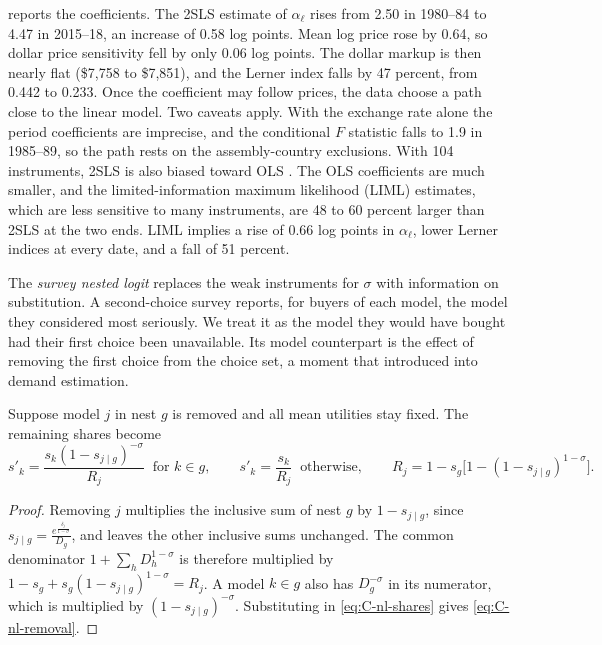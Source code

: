  reports the coefficients. The 2SLS estimate of $\alpha_\ell$ rises from 2.50 in 1980--84 to
4.47 in 2015--18, an increase of 0.58 log points. Mean log price rose by 0.64, so dollar price sensitivity fell by only
0.06 log points. The dollar markup is then nearly flat (\$7,758 to \$7,851), and the Lerner index falls by 47 percent,
from 0.442 to 0.233. Once the coefficient may follow prices, the data choose a path close to the linear model. Two
caveats apply. With the exchange rate alone the period coefficients are imprecise, and the conditional $F$ statistic
falls to 1.9 in 1985--89, so the path rests on the assembly-country exclusions. With 104 instruments, 2SLS is also
biased toward OLS \citep{Bekker1994}. The OLS coefficients are much smaller, and the limited-information maximum
likelihood (LIML) estimates, which are less sensitive to many instruments, are 48 to 60 percent larger than 2SLS at the
two ends. LIML implies a rise of 0.66 log points in $\alpha_\ell$, lower Lerner indices at every date, and a fall of 51
percent.

The \emph{survey nested logit} replaces the weak instruments for $\sigma$ with information on substitution. A
second-choice survey reports, for buyers of each model, the model they considered most seriously. We treat it as the
model they would have bought had their first choice been unavailable. Its model
counterpart is the effect of removing the first choice from the choice set, a moment that \citet{BerryLevinsohnPakes2004}
introduced into demand estimation.

\begin{lemma}\label{lem:C-nl-removal}
Suppose model $j$ in nest $g$ is removed and all mean utilities stay fixed. The remaining shares become
\begin{equation}\label{eq:C-nl-removal}
  s'_k = \frac{s_k(1 - s_{j\mid g})^{-\sigma}}{R_j} \ \text{ for } k \in g , \qquad
  s'_k = \frac{s_k}{R_j} \ \text{ otherwise} , \qquad
  R_j = 1 - s_g\big[1 - (1 - s_{j\mid g})^{1 - \sigma}\big] .
\end{equation}
\end{lemma}

\begin{proof}
Removing $j$ multiplies the inclusive sum of nest $g$ by $1 - s_{j\mid g}$, since
$s_{j\mid g} = \frac{e^{\frac{\delta_j}{1 - \sigma}}}{D_g}$, and leaves the other inclusive sums unchanged. The common
denominator $1 + \sum_hD_h^{1 - \sigma}$ is therefore multiplied by
$1 - s_g + s_g(1 - s_{j\mid g})^{1 - \sigma} = R_j$. A model $k \in g$ also has $D_g^{-\sigma}$ in its numerator, which is
multiplied by $(1 - s_{j\mid g})^{-\sigma}$. Substituting in \eqref{eq:C-nl-shares} gives \eqref{eq:C-nl-removal}.
\end{proof}

